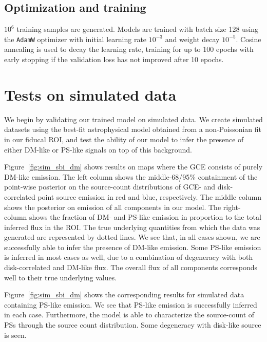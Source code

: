 \documentclass[prd,aps,10pt,nofootinbib,twocolumn,superscriptaddress,preprintnumbers,balancelastpage,longbibliography]{revtex4-1}
\begin{document}
\subsection{Optimization and training}

$10^{6}$ training samples are generated. Models are trained with batch size 128 using the \texttt{AdamW} optimizer with initial learning rate $10^{-3}$ and weight decay $10^{-5}$. Cosine annealing is used to decay the learning rate, training for up to 100 epochs with early stopping if the validation loss has not improved after 10 epochs.

\section{Tests on simulated data}
\label{sec:simulations}

We begin by validating our trained model on simulated data. We create simulated datasets using the best-fit astrophysical model obtained from a non-Poissonian fit in our fiducal ROI, and test the ability of our model to infer the presence of either DM-like or PS-like signals on top of this background.

Figure~\ref{fig:sim_sbi_dm} shows results on maps where the GCE consists of purely DM-like emission. The left column shows the middle-68/95\% containment of the point-wise posterior on the source-count distributions of GCE- and disk-correlated point source emission in red and blue, respectively. The middle column shows the posterior on emission of all components in our model. The right- column shows the fraction of DM- and PS-like emission in proportion to the total inferred flux in the ROI. The true underlying quantities from which the data was generated are represented by dotted lines. We see that, in all cases shown, we are successfully able to infer the presence of DM-like emission. Some PS-like emission is inferred in most cases as well, due to a combination of degeneracy with both disk-correlated and DM-like flux. The overall flux of all components corresponds well to their true underlying values.

Figure~\ref{fig:sim_sbi_dm} shows the corresponding results for simulated data containing PS-like emission. We see that PS-like emission is successfully inferred in each case. Furthermore, the model is able to characterize the source-count of PSs through the source count distribution. Some degeneracy with disk-like source is seen.
\end{document}

